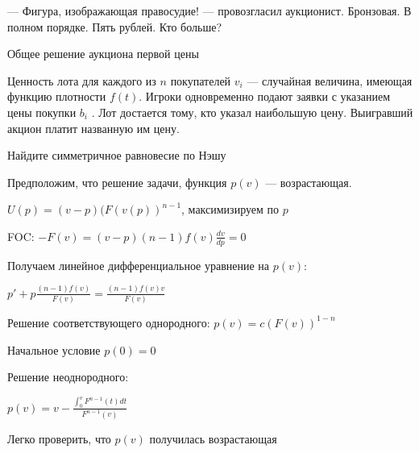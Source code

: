 — Фигура, изображающая правосудие! — провозгласил аукционист. Бронзовая. В полном порядке. Пять рублей. Кто больше?



\begin{problem}
 Общее решение аукциона первой цены \par
Ценность лота для каждого из $n$ покупателей  $v_{i} $  — случайная величина, имеющая функцию плотности $f(t)$. Игроки одновременно подают заявки с указанием цены покупки  $b_{i}$ . Лот достается тому, кто указал наибольшую цену. Выигравший акцион платит названную им цену. \par
Найдите симметричное равновесие по Нэшу



\begin{sol}

Предположим, что решение задачи, функция $p(v)$ — возрастающая. \par
$U(p)=(v-p)(F(v(p))^{n-1}$, максимизируем по $p$ \par
FOC: $-F(v)=(v-p)(n-1)f(v)\frac{dv}{dp}=0$ \par
Получаем линейное дифференциальное уравнение на $p(v)$: \par
$p'+p\frac{(n-1)f(v)}{F(v)}=\frac{(n-1)f(v)v}{F(v)}$ \par
Решение соответствующего однородного: $p(v)=c(F(v))^{1-n}$ \par
Начальное условие $p(0)=0$ \par
Решение неоднородного: \par
$p(v)=v-\frac{\int_{0}^{v}F^{n-1}(t)dt}{F^{n-1}(v)}$ \par
Легко проверить, что $p(v)$ получилась возрастающая
\end{sol}
\end{problem}



